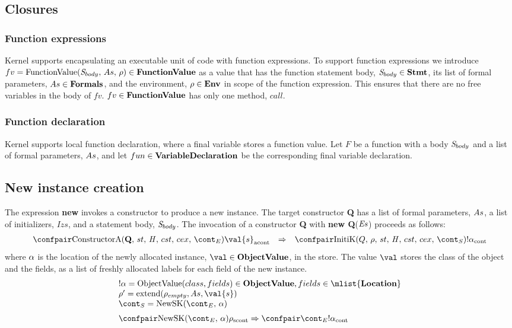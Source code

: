 \documentclass{article}
\DeclareMathOperator{\extend}{extend}
\begin{document}
\subsection{Closures}
\subsubsection{Function expressions}

Kernel supports encapsulating an executable unit of code with function expressions.
To support function expressions we introduce $fv = \mathrm{FunctionValue}({\mathit{S}_{body}},\,{As},\,{\rho}) \in \mathbf{FunctionValue}$ as a value that has the function statement body, $\mathit{S}_{body} \in \mathbf{Stmt}$, its list of formal parameters, $As \in \mathbf{Formals}$, and the environment, $\rho \in \mathbf{Env}$ in scope of the function expression.
This ensures that there are no free variables in the body of $fv$.
$fv \in \mathbf{FunctionValue}$ has only one method, $call$.

\subsubsection{Function declaration}
Kernel supports local function declaration, where a final variable stores a function value.
Let $F$ be a function with a body $\mathit{S}_{body}$ and a list of formal parameters, $As$, and let $fun \in \mathbf{VariableDeclaration}$ be the corresponding final variable declaration.

\subsection{New instance creation}

The expression \textbf{new} invokes a constructor to produce a new instance.
The target constructor \textbf{Q} has a list of formal parameters, $As$, a list of initializers, $Izs$, and a statement body, $\mathit{S}_{body}$.
The invocation of a constructor \textbf{Q} with \textbf{new Q}($\mathit{E}\mathit{s}$) proceeds as follows:
\[
  \begin{array}{lcl}
	\acontconf{\ConstructorA{\textbf{Q}}{\econt}}{\val{s}}
	& \Rightarrow &
	\contconf{\InitK{Q}{\env}{\scont}}{!\loc}
  \end{array}
\]
\noindent
where $\alpha$ is the location of the newly allocated instance, $\val \in \dobjval$, in the store.
The value $\val$ stores the class of the object and the fields, as a list of freshly allocated labels for each field of the new instance.
\[
  \begin{array}{l}
	\deref{\loc} = \objval \in \dobjval, fields \in \mlist{\dlocation}\\
	\env' = \extend(\env_{empty}, \formals, \val{s})\\
	\scont = \NewSK{\econt}{\loc} \\[2mm]

	\scontconf{\NewSK{\econt}{\loc}}{\env}
	\Rightarrow
	\contconf{\econt}{\deref{\loc}}
  \end{array}
\]
\end{document}
